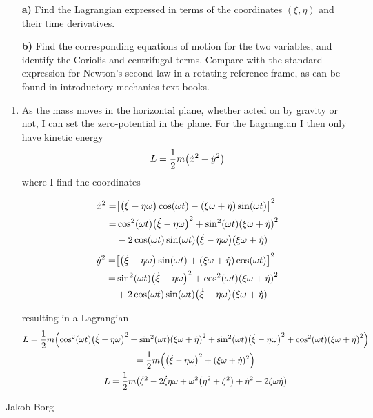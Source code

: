 \documentclass[11pt,a4paper]{report}
\newcounter{excount}[chapter]
\newenvironment{exercise}[1][]{\addtocounter{excount}{1} \noindent {\bf Problem
    \arabic{excount} \ \ #1}\hspace{2mm}}{\vspace{4mm}}
\newenvironment{solution}
    {\begin{tcolorbox}[title=Solution,halign lower=right,breakable]
    }
    {
    \tcblower Jakob Borg
    \end{tcolorbox}
	\vspace{5mm}
    }
\newcommand{\half}
{
\frac{1}{2}
}
\newcommand{\coswt}
{
\cos(\omega t)
}
\newcommand{\sinwt}
{
\sin(\omega t)
}
\newcommand{\coscoswt}
{
\cos^2(\omega t)
}
\newcommand{\sinsinwt}
{
\sin^2(\omega t)
}
\begin{document}
\begin{exercise}
\begin{itemize}
\item[\bf a)] Find the Lagrangian expressed in terms of the coordinates $(\xi,\eta)$ and their time derivatives.
\item[\bf b)] Find the corresponding equations of motion for the two variables, and identify the Coriolis and centrifugal terms.
Compare with the standard expression for Newton's second law in a rotating reference frame, as can be found in introductory mechanics text books.
\end{itemize}
\begin{solution}
\begin{enumerate}[\bf a)]
\item As the mass moves in the horizontal plane, whether acted on by gravity or not, I can set the zero-potential in the plane. For the Lagrangian I then only have kinetic energy
\begin{gather*}
L = \half m \qty(\dot{x}^2 + \dot{y}^2)
\end{gather*}
where I find the coordinates
\begin{multicols}{2}
\small
\noindent
\begin{align*}
\dot{x}^2 =& \qty[\qty(\dot{\xi} -\eta \omega) \coswt - \qty(\xi\omega+\dot{\eta}) \sinwt]^2
\\
=& \coscoswt \qty(\dot{\xi}-\eta\omega)^2 + \sinsinwt\qty(\xi\omega + \dot{\eta})^2 
\\
&-2\coswt\sinwt \qty(\dot{\xi} -\eta \omega) \qty(\xi\omega+\dot{\eta})
\end{align*}
\begin{align*}
\dot{y}^2 =& \qty[ \qty(\dot{\xi} -\eta \omega) \sinwt + \qty(\xi\omega+\dot{\eta}) \coswt ]^2
\\
=&  \sinsinwt\qty(\dot{\xi}-\eta\omega)^2 +\coscoswt \qty(\xi\omega + \dot{\eta})^2 
\\
&+2\coswt\sinwt \qty(\dot{\xi} -\eta \omega) \qty(\xi\omega+\dot{\eta})
\end{align*}
\end{multicols}
resulting in a Lagrangian
\begin{gather*}
L = \half m \qty( \coscoswt \qty(\dot{\xi}-\eta\omega)^2 + \sinsinwt\qty(\xi\omega + \dot{\eta})^2 +  \sinsinwt\qty(\dot{\xi}-\eta\omega)^2 +\coscoswt \qty(\xi\omega + \dot{\eta})^2 )
\\
= \half m \qty( \qty(\dot{\xi}-\eta\omega)^2 +(\xi\omega + \dot{\eta})^2 )
\\
L = \half m \qty( \dot{\xi}^2 - 2 \dot{\xi}\eta\omega + \omega^2 \qty(\eta^2 + \xi^2) + \dot{\eta}^2 + 2\xi\omega\dot{\eta})

\end{gather*}
\end{enumerate}
\end{solution}
\end{exercise}
\end{document}
